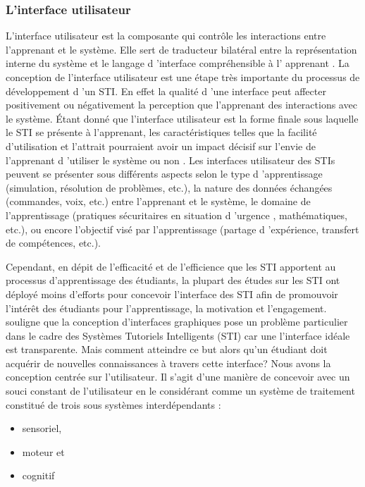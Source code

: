 \subsubsection{L'interface utilisateur}
L'interface utilisateur est la composante qui contrôle les interactions entre l'apprenant et le système. Elle sert de traducteur bilatéral entre la représentation interne du système et le langage d 'interface compréhensible à l' apprenant \cite{nwana}. La conception de l'interface utilisateur est une étape très importante du processus de développement d 'un STI. En effet la qualité d 'une interface peut affecter positivement ou négativement la perception que l'apprenant des interactions avec le système.  Étant donné que l'interface utilisateur est la forme finale sous laquelle le STI se présente à l'apprenant, les caractéristiques telles que la facilité d'utilisation et l'attrait pourraient avoir un impact décisif sur l'envie de l'apprenant d 'utiliser le système ou non \cite{nwana} .  Les interfaces utilisateur des STIs peuvent se présenter sous différents aspects selon le type d 'apprentissage (simulation, résolution de problèmes, etc.), la nature des données échangées (commandes, voix, etc.) entre l'apprenant et le système, le domaine de l'apprentissage (pratiques sécuritaires en situation d 'urgence , mathématiques, etc.), ou encore l'objectif visé par l'apprentissage (partage d 'expérience, transfert de compétences, etc.). 

Cependant, en dépit de l'efficacité et de l'efficience que les STI apportent au processus d'apprentissage des étudiants, la plupart des études sur les STI ont déployé moins d'efforts pour concevoir l'interface des STI afin de promouvoir l'intérêt des étudiants pour l'apprentissage, la motivation et l'engagement. \cite{guide_ui_conception} souligne que la conception d'interfaces graphiques pose un problème particulier dans le cadre des Systèmes Tutoriels Intelligents (STI) car une l'interface idéale est transparente. Mais comment atteindre ce but alors qu'un étudiant doit acquérir de nouvelles connaissances à travers cette interface? Nous avons la conception centrée sur l'utilisateur. Il s'agit d'une manière de concevoir avec un souci constant de l'utilisateur en le considérant comme un système de traitement constitué de trois sous systèmes interdépendants \cite{ccu}:
    \begin{itemize}
        \item sensoriel,
        \item moteur et
        \item cognitif
    \end{itemize}
    
